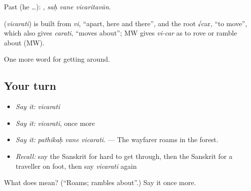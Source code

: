 Past (he …):   , \emph{saḥ vane vicaritavān}.

\begin{cousinweb}
\textbf{} (\emph{vicarati}) is built from \emph{vi}, \textquotedblleft{}apart, here and there\textquotedblright{}, and the root √car, \textquotedblleft{}to move\textquotedblright{}, which also gives \emph{carati}, \textquotedblleft{}moves about\textquotedblright{}; MW gives \emph{vi-car} as to rove or ramble about (MW).
\end{cousinweb}

\begin{grammarlens}[title={What you've built}]
One more word for getting around.
\end{grammarlens}

\subsection*{Your turn}
\begin{itemize}
\raggedright
  \item \emph{Say it:} \emph{vicarati}
  \item \emph{Say it:} \emph{vicarati}, once more
  \item \emph{Say it:} \emph{pathikaḥ vane vicarati.} — The wayfarer roams in the forest.
  \item \emph{Recall:} say the Sanskrit for hard to get through, then the Sanskrit for a traveller on foot, then say \emph{vicarati} again
\end{itemize}

\begin{tcolorbox}[breakable,colback=teal!4,colframe=teal!35!black,title={Before you move on}]
What does  mean? (\textquotedblleft{}Roams; rambles about\textquotedblright{}.) Say it once more.
\end{tcolorbox}
